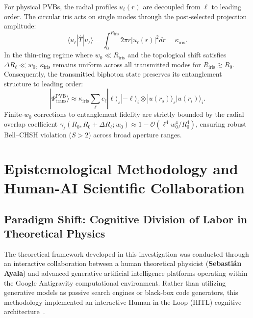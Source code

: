 \documentclass[11pt,a4paper]{article}
\begin{document}
For physical PVBs, the radial profiles $u_\ell(r)$ are decoupled from $\ell$ to leading order. The circular iris acts on single modes through the post-selected projection amplitude:
\begin{equation}
\langle u_\ell | \hat{T} | u_\ell \rangle = \int_0^{R_{\text{iris}}} 2\pi r |u_\ell(r)|^2 dr = \kappa_{\text{iris}}.
\label{eq:pvb_pupil_scalar}
\end{equation}
In the thin-ring regime where $w_0 \ll R_{\text{iris}}$ and the topological shift satisfies $\Delta R_\ell \ll w_0$, $\kappa_{\text{iris}}$ remains uniform across all transmitted modes for $R_{\text{iris}} \gtrsim R_0$. Consequently, the transmitted biphoton state preserves its entanglement structure to leading order:
\begin{equation}
|\Psi_{\text{trans}}^{\text{PVB}}\rangle \approx \kappa_{\text{iris}} \sum_{\ell} c_\ell |\ell\rangle_s |-\ell\rangle_i \otimes |u(r_s)\rangle_s |u(r_i)\rangle_i.
\label{eq:pvb_transmitted_state}
\end{equation}
Finite-$w_0$ corrections to entanglement fidelity are strictly bounded by the radial overlap coefficient $\gamma_\ell(R_0, R_0 + \Delta R_\ell; w_0) \approx 1 - \mathcal{O}(\ell^4 w_0^4 / R_0^4)$, ensuring robust Bell--CHSH violation ($S > 2$) across broad aperture ranges.


\section{Epistemological Methodology and Human-AI Scientific Collaboration}
\label{sec:co_creation}

\subsection{Paradigm Shift: Cognitive Division of Labor in Theoretical Physics}
The theoretical framework developed in this investigation was conducted through an interactive collaboration between a human theoretical physicist (\textbf{Sebastián Ayala}) and advanced generative artificial intelligence platforms operating within the Google Antigravity computational environment. Rather than utilizing generative models as passive search engines or black-box code generators, this methodology implemented an interactive Human-in-the-Loop (HITL) cognitive architecture~\cite{VillaescusaNavarro2026,Chandra2026TheoPhysEval}.
\end{document}
